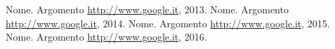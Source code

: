 \begin{thebibliography}{90}             %
\rhead[\fancyplain{}{\bfseries \leftmark}]{\fancyplain{}{\bfseries
\thepage}}
 Nome. Argomento \url{http://www.google.it}, 2013.
 Nome. Argomento \url{http://www.google.it}, 2014.
 Nome. Argomento \url{http://www.google.it}, 2015.
 Nome. Argomento \url{http://www.google.it}, 2016.

\end{thebibliography}
\clearpage{\pagestyle{empty}\cleardoublepage}
